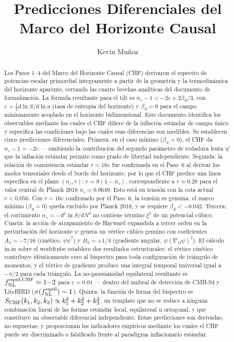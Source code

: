 \documentclass[12pt,a4paper]{article}
\title{Predicciones Diferenciales del Marco del Horizonte Causal}
\author{Kevin Mu\~noz}
\date{}
\begin{document}
\maketitle

\begin{abstract}
Los Pasos 1--4 del Marco del Horizonte Causal (CHF) derivaron el espectro de potencias escalar primordial íntegramente a partir de la geometría y la termodinámica del horizonte aparente, cerrando las cuatro brechas analíticas del documento de formalización. La fórmula resultante para el tilt es $n_s - 1 = -2\varepsilon + 2\beta_S/3$, con $\varepsilon = \frac{1}{2}d\ln S/d\ln a$ (tasa de entropía del horizonte) y $\beta_S = 0$ para el campo mínimamente acoplado en el horizonte bidimensional. Este documento identifica los observables mediante los cuales el CHF difiere de la inflación estándar de campo único y especifica las condiciones bajo las cuales esas diferencias son medibles. Se establecen cinco predicciones diferenciales. Primera: en el caso mínimo ($\beta_S = 0$), el CHF da $n_s - 1 = -2\varepsilon$ --- omitiendo la contribución del segundo parámetro de rodadura lenta $\eta'$ que la inflación estándar permite como grado de libertad independiente. Segunda: la relación de consistencia estándar $r = 16\varepsilon$ fue confirmada en el Paso~6 al derivar los modos tensoriales desde el borde del horizonte, por lo que el CHF predice una línea específica en el plano $(n_s, r)$: $r = 8(1 - n_s)$, correspondiente a $r \approx 0.28$ para el valor central de Planck 2018 $n_s = 0.9649$. Esto está en tensión con la cota actual $r < 0.056$. Con $r = 16\varepsilon$ confirmado por el Paso~6, la tensión es genuina: el marco mínimo ($\beta_S = 0$) queda excluido por Planck 2018, y se requiere $\beta_S < -0.042$. Tercera: el corrimiento $\alpha_s = -d^2\ln S/dN^2$ no contiene término $\xi^2$ de un potencial cúbico. Cuarta: la acción de atrapamiento de Hayward expandida a tercer orden en la perturbación del horizonte $\psi$ genera un vértice cúbico genuino con coeficientes $A_3 = -7/16$ (cinético, $\psi\dot\psi^2$) y $B_3 = +1/4$ (gradiente angular, $\psi(\nabla_\Omega\psi)^2$). El cálculo in-in sobre el worldtube establece dos resultados estructurales: el vértice cinético contribuye idénticamente cero al bispectro para toda configuración de triángulo de momentos, y el vértice de gradiente produce una integral temporal universal igual a $-\pi/2$ para cada triángulo. La no-gaussianidad equilateral resultante es $f_{\rm NL}^{\rm equil, CHF} \approx 1{-}2$ para $\varepsilon = 0.01$ --- dentro del umbral de detección de CMB-S4 y LiteBIRD ($\sigma(f_{\rm NL}^{\rm equil}) \sim 1$). Quinta: la función de forma del bispectro es $S_{\rm CHF}(k_1,k_2,k_3) \propto k_1^2+k_2^2+k_3^2$, un template que no se reduce a ninguna combinación lineal de las formas estándar local, equilateral u ortogonal, y que constituye un observable diferencial independiente. Estas predicciones son derivadas, no supuestas, y proporcionan los indicadores empíricos mediante los cuales el CHF puede ser discriminado o falsificado frente al paradigma inflacionario estándar.
\end{abstract}
\end{document}
